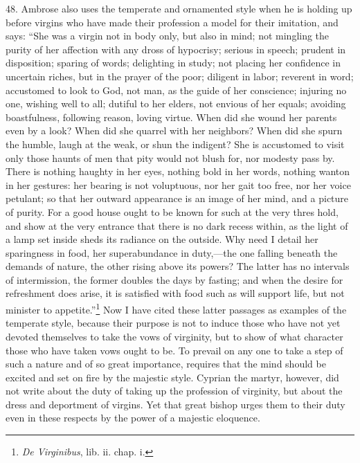 48. Ambrose also uses the temperate and ornamented style when he is holding up before virgins who have made their profession a model for their imitation, and says: “She was a virgin not in body only, but also in mind; not mingling the purity of her affection with any dross of hypocrisy; serious in speech; prudent in disposition; sparing of words; delighting in study; not placing her confidence in uncertain riches, but in the prayer of the poor; diligent in labor; reverent in word; accustomed to look to God, not man, as the guide of her conscience; injuring no one, wishing well to all; dutiful to her elders, not envious of her equals; avoiding boastfulness, following reason, loving virtue. When did she wound her parents even by a look? When did she quarrel with her neighbors? When did she spurn the humble, laugh at the weak, or shun the indigent? She is accustomed to visit only those haunts of men that pity would not blush for, nor modesty pass by. There is nothing haughty in her eyes, nothing bold in her words, nothing wanton in her gestures: her bearing is not voluptuous, nor her gait too free, nor her voice petulant; so that her outward appearance is an image of her mind, and a picture of purity. For a good house ought to be known for such at the very thres  hold, and show at the very entrance that there is no dark recess within, as the light of a lamp set inside sheds its radiance on the outside. Why need I detail her sparingness in food, her superabundance in duty,—the one falling beneath the demands of nature, the other rising above its powers? The latter has no intervals of intermission, the former doubles the days by fasting; and when the desire for refreshment does arise, it is satisfied with food such as will support life, but not minister to appetite.”\footnote{\emph{De Virginibus}, lib. ii. chap. i.} Now I have cited these latter passages as examples of the temperate style, because their purpose is not to induce those who have not yet devoted themselves to take the vows of virginity, but to show of what character those who have taken vows ought to be. To prevail on any one to take a step of such a nature and of so great importance, requires that the mind should be excited and set on fire by the majestic style. Cyprian the martyr, however, did not write about the duty of taking up the profession of virginity, but about the dress and deportment of virgins. Yet that great bishop urges them to their duty even in these respects by the power of a majestic eloquence.

